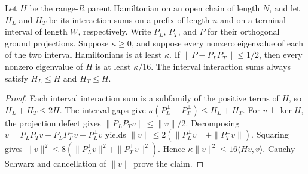 \begin{lemma}
    \label{thm:open_parent_overlapping_interval_gap}
    \leanok
    Let $H$ be the range-$R$ parent Hamiltonian on an open chain of length
    $N$, and let $H_L$ and $H_T$ be its interaction sums on a prefix of
    length $n$ and on a terminal interval of length $W$, respectively.
    Write $P_L$, $P_T$, and $P$ for their orthogonal ground projections.
    Suppose $\kappa\geq0$, and suppose every nonzero eigenvalue of each of
    the two interval Hamiltonians is at least $\kappa$.
    If $\|P-P_LP_T\|\leq1/2$, then every nonzero eigenvalue of $H$ is at
    least $\kappa/16$.
    The interval interaction sums always satisfy $H_L\leq H$ and
    $H_T\leq H$.
\end{lemma}
\begin{proof}\leanok
    Each interval interaction sum is a subfamily of the positive terms of
    $H$, so $H_L+H_T\leq2H$. The interval gaps give
    $\kappa(P_L^\perp+P_T^\perp)\leq H_L+H_T$.
    For $v\perp\ker H$, the projection defect gives
    $\|P_LP_Tv\|\leq\|v\|/2$. Decomposing
    $v=P_LP_Tv+P_LP_T^\perp v+P_L^\perp v$ yields
    $\|v\|\leq2(\|P_L^\perp v\|+\|P_T^\perp v\|)$.
    Squaring gives
    $\|v\|^2\leq8(\|P_L^\perp v\|^2+\|P_T^\perp v\|^2)$.
    Hence $\kappa\|v\|^2\leq16\langle Hv,v\rangle$.
    Cauchy--Schwarz and cancellation of $\|v\|$ prove the claim.
\end{proof}

